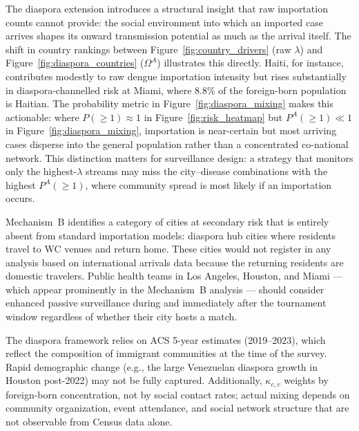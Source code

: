 \documentclass[12pt]{article}
\begin{document}
The diaspora extension introduces a structural insight that raw importation
counts cannot provide: the social environment into which an imported case
arrives shapes its onward transmission potential as much as the arrival itself.
The shift in country rankings between Figure~\ref{fig:country_drivers} (raw
$\lambda$) and Figure~\ref{fig:diaspora_countries} ($\Omega^A$) illustrates
this directly. Haiti, for instance, contributes modestly to raw dengue
importation intensity but rises substantially in diaspora-channelled risk at
Miami, where 8.8\% of the foreign-born population is Haitian. The probability
metric in Figure~\ref{fig:diaspora_mixing} makes this actionable: where
$P(\geq 1) \approx 1$ in Figure~\ref{fig:risk_heatmap} but
$P^A(\geq 1) \ll 1$ in Figure~\ref{fig:diaspora_mixing}, importation is
near-certain but most arriving cases disperse into the general population
rather than a concentrated co-national network. This distinction matters
for surveillance design: a strategy that monitors only the highest-$\lambda$
streams may miss the city--disease combinations with the highest
$P^A(\geq 1)$, where community spread is most likely if an importation occurs.

Mechanism~B identifies a category of cities at secondary risk that is entirely
absent from standard importation models: diaspora hub cities where residents
travel to WC venues and return home. These cities would not register in any
analysis based on international arrivals data because the returning residents
are domestic travelers. Public health teams in Los Angeles, Houston, and Miami
--- which appear prominently in the Mechanism~B analysis --- should consider
enhanced passive surveillance during and immediately after the tournament window
regardless of whether their city hosts a match.

The diaspora framework relies on ACS 5-year estimates (2019--2023), which
reflect the composition of immigrant communities at the time of the survey.
Rapid demographic change (e.g., the large Venezuelan diaspora growth in Houston
post-2022) may not be fully captured. Additionally, $\kappa_{c,v}$ weights by
foreign-born concentration, not by social contact rates; actual mixing depends
on community organization, event attendance, and social network structure that
are not observable from Census data alone.
\end{document}
